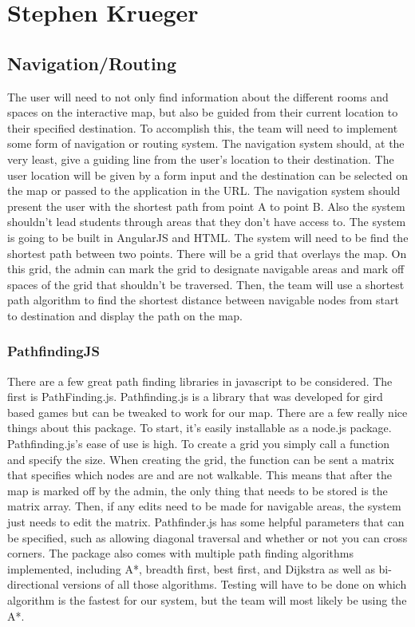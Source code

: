 \documentclass[letterpaper,10pt,titlepage, onecolumn, compsoc]{IEEEtran}
\begin{document}
\section{Stephen Krueger}

\subsection{Navigation/Routing}
The user will need to not only find information about the different rooms and spaces on the interactive map, but also be guided from their current location to their specified destination. To accomplish this, the team will need to implement some form of navigation or routing system. The navigation system should, at the very least, give a guiding line from the user’s location to their destination. The user location will be given by a form input and the destination can be selected on the map or passed to the application in the URL.  The navigation system should present the user with the shortest path from point A to point B. Also the system shouldn’t lead students through areas that they don’t have access to. 
\linebreak
The system is going to be built in AngularJS and HTML. The system will need to be find the shortest path between two points. There will be a grid that overlays the map. On this grid, the admin can mark the grid to designate navigable areas and mark off spaces of the grid that shouldn’t be traversed. Then, the team will use a shortest path algorithm to find the shortest distance between navigable nodes from start to destination and display the path on the map. 

\subsubsection{PathfindingJS}
There are a few great path finding libraries in javascript to be considered. The first is PathFinding.js. Pathfinding.js is a library that was developed for gird based games but can be tweaked to work for our map. There are a few really nice things about this package. To start, it’s easily installable as a node.js package. Pathfinding.js’s ease of use is high. To create a grid you simply call a function and specify the size. When creating the grid, the function can be sent a matrix that specifies which nodes are and are not walkable. This means that after the map is marked off by the admin, the only thing that needs to be stored is the matrix array. Then, if any edits need to be made for navigable areas, the system just needs to edit the matrix. 
Pathfinder.js has some helpful parameters that can be specified, such as allowing diagonal traversal and whether or not you can cross corners. The package also comes with multiple path finding algorithms implemented, including A*, breadth first, best first, and Dijkstra as well as bi-directional versions of all those algorithms. Testing will have to be done on which algorithm is the fastest for our system, but the team will most likely be using the A*. 
\cite{pathfinding}
\end{document}
